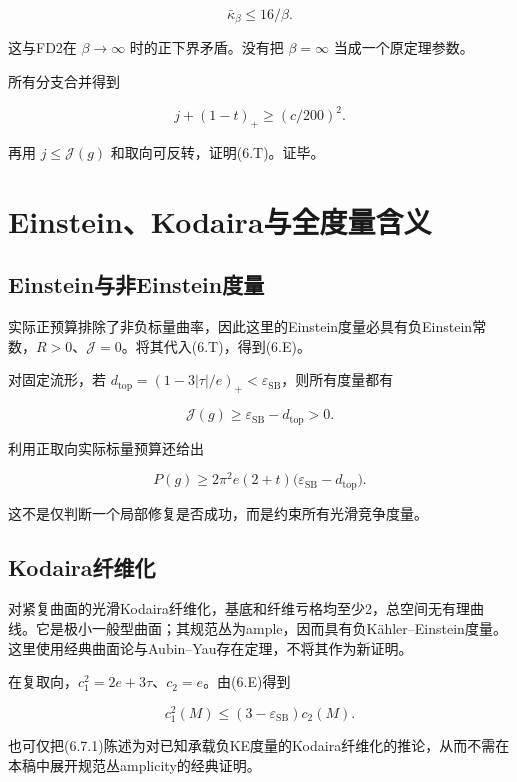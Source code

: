 \documentclass[UTF8,11pt,fontset=none]{ctexart}
\theoremstyle{definition}
\theoremstyle{remark}
\begin{document}
\[
\bar\kappa_\beta\le16/\beta.
\]

这与FD2在 \(\beta\to\infty\) 时的正下界矛盾。没有把 \(\beta=\infty\) 当成一个原定理参数。

所有分支合并得到

\[
j+(1-t)_+\ge(c/200)^2.
\]

再用 \(j\le\mathcal J(g)\) 和取向可反转，证明(6.T)。证毕。

\section{Einstein、Kodaira与全度量含义}\label{v6-einsteinkodairaux4e0eux5168ux5ea6ux91cfux542bux4e49}

\subsection{Einstein与非Einstein度量}\label{v6-einsteinux4e0eux975eeinsteinux5ea6ux91cf}

实际正预算排除了非负标量曲率，因此这里的Einstein度量必具有负Einstein常数，\(R>0\)、\(\mathcal J=0\)。将其代入(6.T)，得到(6.E)。

对固定流形，若 \(d_{\mathrm{top}}=(1-3|\tau|/e)_+<\varepsilon_{\mathrm{SB}}\)，则所有度量都有

\[
\mathcal J(g)\ge\varepsilon_{\mathrm{SB}}-d_{\mathrm{top}}>0.
\]

利用正取向实际标量预算还给出

\[
P(g)\ge2\pi^2 e(2+t)
\bigl(\varepsilon_{\mathrm{SB}}-d_{\mathrm{top}}\bigr).
\]

这不是仅判断一个局部修复是否成功，而是约束所有光滑竞争度量。

\subsection{Kodaira纤维化}\label{v6-kodairaux7ea4ux7ef4ux5316}

对紧复曲面的光滑Kodaira纤维化，基底和纤维亏格均至少2，总空间无有理曲线。它是极小一般型曲面；其规范丛为ample，因而具有负Kähler--Einstein度量。这里使用经典曲面论与Aubin--Yau存在定理，不将其作为新证明。

在复取向，\(c_1^2=2e+3\tau\)、\(c_2=e\)。由(6.E)得到

\[
\boxed{c_1^2(M)\le(3-\varepsilon_{\mathrm{SB}})c_2(M).}
\tag{6.7.1}
\]

也可仅把(6.7.1)陈述为对已知承载负KE度量的Kodaira纤维化的推论，从而不需在本稿中展开规范丛amplicity的经典证明。
\end{document}
